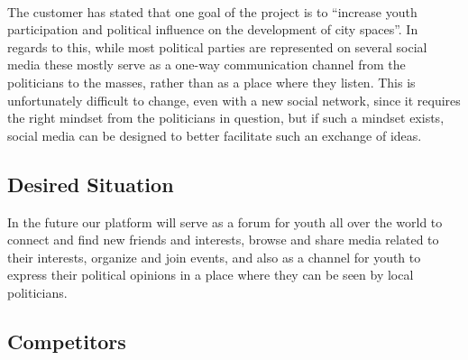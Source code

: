 \paragraph{} The customer has stated that one goal of the project is to “increase youth participation and political influence on the development of city spaces”. In regards to this, while most political parties are represented on several social media these mostly serve as a one-way communication channel from the politicians to the masses, rather than as a place where they listen. This is unfortunately difficult to change, even with a new social network, since it requires the right mindset from the politicians in question, but if such a mindset exists, social media can be designed to better facilitate such an exchange of ideas.

\subsection{Desired Situation}
\label{subsec:PrelimMarketDesired}

In the future our platform will serve as a forum for youth all over the world to connect and find new friends and interests, browse and share media related to their interests, organize and join events, and also as a channel for youth to express their political opinions in a place where they can be seen by local politicians.

\subsection{Competitors}
\label{subsec:PrelimMarketCompetitors}

